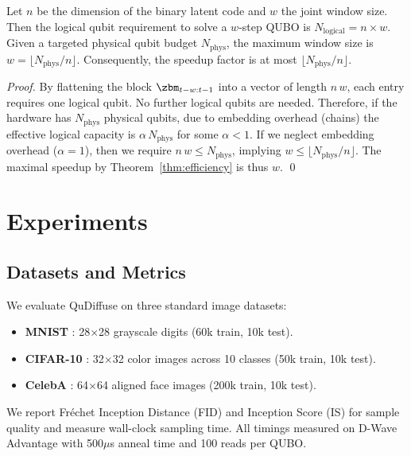 \documentclass[11pt,letterpaper]{article}
\begin{document}
\begin{theorem}
\label{thm:qubit-scaling}
Let $n$ be the dimension of the binary latent code and $w$ the joint window size. Then the logical qubit requirement to solve a $w$-step QUBO is $N_{\text{logical}} = n \times w$. Given a targeted physical qubit budget $N_{\text{phys}}$, the maximum window size is $w = \lfloor N_{\text{phys}} / n \rfloor$. Consequently, the speedup factor is at most $\lfloor N_{\text{phys}} / n \rfloor$.
\end{theorem}

\begin{proof}
By flattening the block $\zbm_{t-w:t-1}$ into a vector of length $n\,w$, each entry requires one logical qubit. No further logical qubits are needed. Therefore, if the hardware has $N_{\text{phys}}$ physical qubits, due to embedding overhead (chains) the effective logical capacity is $\alpha\,N_{\text{phys}}$ for some $\alpha < 1$. If we neglect embedding overhead ($\alpha=1$), then we require $n\,w \le N_{\text{phys}}$, implying $w \le \lfloor N_{\text{phys}} / n \rfloor$. The maximal speedup by Theorem~\ref{thm:efficiency} is thus $w$. \qed
\end{proof}

\section{Experiments}
\label{sec:experiments}

\subsection{Datasets and Metrics}
We evaluate QuDiffuse on three standard image datasets: 
\begin{itemize}[noitemsep,topsep=0pt]
    \item \textbf{MNIST} \cite{lecun1998gradient}: 28$\times$28 grayscale digits (60k train, 10k test).
    \item \textbf{CIFAR-10} \cite{krizhevsky2009learning}: 32$\times$32 color images across 10 classes (50k train, 10k test).
    \item \textbf{CelebA} \cite{liu2015deep}: 64$\times$64 aligned face images (200k train, 10k test).
\end{itemize}
We report Fréchet Inception Distance (FID) \cite{heusel2017gans} and Inception Score (IS) \cite{salimans2016improved} for sample quality and measure wall-clock sampling time. All timings measured on D-Wave Advantage with 500$\mu$s anneal time and 100 reads per QUBO.
\end{document}
